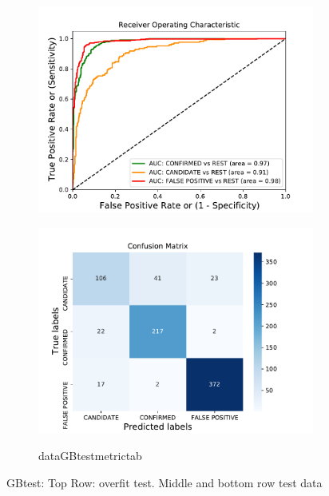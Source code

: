 \begin{figure}[H]
\begin{mdframed}[linecolor=green]
\begin{subfigure}{.49\textwidth}
                \includegraphics[width = 1\textwidth]{data/GBtest_roc.pdf}
                \end{subfigure}
                \begin{subfigure}{.49\textwidth}
                \includegraphics[width = 1\textwidth]{data/GBtest_cm.pdf}
                \end{subfigure}
                \begin{subfigure}{1\textwidth}
                \csname dataGBtestmetrictab\endcsname
                \end{subfigure}
                \caption{GBtest: Top Row: overfit test. Middle and bottom row test data}
                \label{fig:data/GBtest_roc}
                \end{mdframed}
                \end{figure}